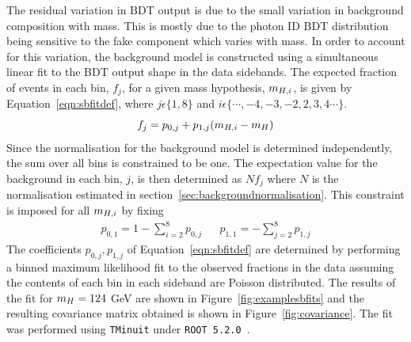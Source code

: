 The residual variation in BDT output is due to the small variation in background composition with mass.
This is mostly due to the photon ID BDT distribution being sensitive to the fake component which 
varies with mass. In order to account for this variation, the background model is constructed using 
a simultaneous linear fit to the BDT output shape in the data sidebands.
The expected fraction of events in each bin, $f_{j}$, for a given mass hypothesis, $m_{H,i}$, is given
by Equation~\ref{eqn:sbfitdef}, where 
$j\epsilon\{1,8\}$ and $i\epsilon\{\cdots,-4,-3,-2,2,3,4\cdots\}$. 
\begin{equation}
f_{j} = p_{0,j} + p_{1,j}(m_{H,i} - m_{H})
\label{eqn:sbfitdef}
\end{equation}
Since the normalisation for the background model is determined independently, 
the sum over all bins is constrained to be one. 
The expectation value for the background in each bin, $j$, is then determined as $Nf_{j}$ where $N$ is the
normalisation estimated in section~\ref{sec:backgroundnormalisation}.
This constraint is imposed for all $m_{H,i}$ by fixing
\begin{eqnarray} 
 p_{0,1} = 1-\sum_{i=2}^{8} p_{0,j} &&  p_{1,1} = - \sum_{j=2}^{8}p_{1,j}
\end{eqnarray}
The coefficients $p_{0,j},p_{1,j}$ of Equation~\ref{eqn:sbfitdef} are determined by performing a binned
maximum likelihood fit to the observed fractions in the data assuming the contents of each bin in each 
sideband are Poisson distributed. The results of the fit for $m_{H}=124$ GeV are shown in 
Figure~\ref{fig:examplesbfits} and the resulting covariance matrix obtained is shown in 
Figure~\ref{fig:covariance}. 
The fit was performed using \texttt{TMinuit} under \texttt{ROOT 5.2.0}~\citep{minuit}. 

